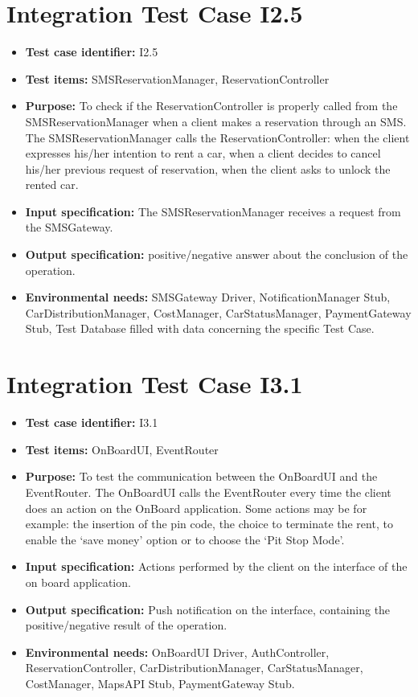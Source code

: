 \section{Integration Test Case I2.5}
\begin{itemize}
\item \textbf{Test case identifier:} I2.5
\item \textbf{Test items:} SMSReservationManager, ReservationController
\item \textbf{Purpose:} To check if the ReservationController is properly called from the SMSReservationManager when a client makes a reservation through an SMS. The SMSReservationManager calls the ReservationController: when the client expresses his/her intention to rent a car, when a client decides to cancel his/her previous request of reservation, when the client asks to unlock the rented car.
\item \textbf{Input specification:} The SMSReservationManager receives a request from the SMSGateway.
\item \textbf{Output specification:} positive/negative answer about the conclusion of the operation.
\item \textbf{Environmental needs:} SMSGateway Driver, NotificationManager Stub, CarDistributionManager, CostManager, CarStatusManager, PaymentGateway Stub, Test Database filled with data concerning the specific Test Case.
\end{itemize}

\section{Integration Test Case I3.1}
\begin{itemize}
\item \textbf{Test case identifier:} I3.1
\item \textbf{Test items:} OnBoardUI, EventRouter
\item \textbf{Purpose:} To test the communication between the OnBoardUI and the EventRouter. The OnBoardUI calls the EventRouter every time the client does an action on the OnBoard application. Some actions may be for example: the insertion of the pin code, the choice to terminate the rent, to enable the ‘save money’ option or to choose the ‘Pit Stop Mode’.
\item \textbf{Input specification:} Actions performed by the client on the interface of the on board application.
\item \textbf{Output specification:} Push notification on the interface, containing the positive/negative result of the operation.
\item \textbf{Environmental needs:} OnBoardUI Driver, AuthController, ReservationController, CarDistributionManager, CarStatusManager, CostManager, MapsAPI Stub, PaymentGateway Stub.
\end{itemize}

